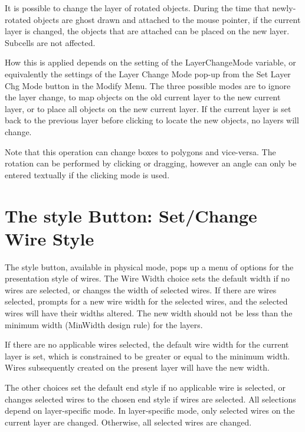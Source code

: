 It is possible to change the layer of rotated objects.  During the
time that newly-rotated objects are ghost drawn and attached to the
mouse pointer, if the current layer is changed, the objects that are
attached can be placed on the new layer.  Subcells are not affected. 

How this is applied depends on the setting of the {\et
LayerChangeMode} variable, or equivalently the settings of the {\cb
Layer Change Mode} pop-up from the {\cb Set Layer Chg Mode} button
in the {\cb Modify Menu}.  The three possible modes are to ignore the
layer change, to map objects on the old current layer to the new
current layer, or to place all objects on the new current layer.  If
the current layer is set back to the previous layer before clicking to
locate the new objects, no layers will change.

Note that this operation can change boxes to polygons and vice-versa. 
The rotation can be performed by clicking or dragging, however an
angle can only be entered textually if the clicking mode is used. 


\section{The {\cb style} Button: Set/Change Wire Style}

The {\cb style} button, available in physical mode, pops up a menu of
options for the presentation style of wires.  The {\cb Wire Width}
choice sets the default width if no wires are selected, or changes the
width of selected wires.  If there are wires selected, {\Xic} prompts
for a new wire width for the selected wires, and the selected wires
will have their widths altered.  The new width should not be less than
the minimum width ({\et MinWidth} design rule) for the layers.

If there are no applicable wires selected, the default wire width for
the current layer is set, which is constrained to be greater or equal
to the minimum width.  Wires subsequently created on the present layer
will have the new width.

The other choices set the default end style if no applicable wire is
selected, or changes selected wires to the chosen end style if wires
are selected.  All selections depend on layer-specific mode.  In
layer-specific mode, only selected wires on the current layer are
changed.  Otherwise, all selected wires are changed.

